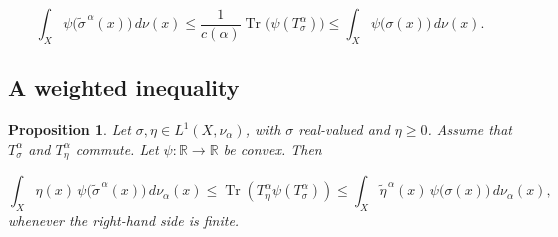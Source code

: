 \documentclass{amsart}
\newtheorem{prop}[thm]{Proposition}
\theoremstyle{definition}
\theoremstyle{remark}
\numberwithin{equation}{section}
\begin{document}
\begin{equation}\label{renorm1}
\int_X
\psi\bigl(\widetilde{\sigma}^{\,\alpha}(x)\bigr)\,d\nu(x)
\leq
\frac{1}{c(\alpha)}
\operatorname{Tr}\bigl(\psi(T_\sigma^\alpha)\bigr)
\leq
\int_X\psi\bigl(\sigma(x)\bigr)\,d\nu(x).
\end{equation}

\subsection*{A weighted inequality}

\begin{prop}\label{BLweighted}
Let $\sigma,\eta\in L^1(X,\nu_\alpha)$, with
$\sigma$ real-valued and $\eta\geq 0$. Assume that
$T_\sigma^\alpha$ and $T_\eta^\alpha$ commute. Let
$\psi:\mathbb{R}\to\mathbb{R}$ be convex. Then

\begin{equation}\label{BL-weighted}
\int_X
\eta(x)\,
\psi\bigl(\widetilde{\sigma}^{\,\alpha}(x)\bigr)
\,d\nu_\alpha(x)
\leq
\operatorname{Tr}\!\left(
T_\eta^\alpha\psi(T_\sigma^\alpha)
\right)
\leq
\int_X
\widetilde{\eta}^{\,\alpha}(x)\,
\psi\bigl(\sigma(x)\bigr)
\,d\nu_\alpha(x),
\end{equation}
whenever the right-hand side is finite.
\end{prop}
\end{document}
